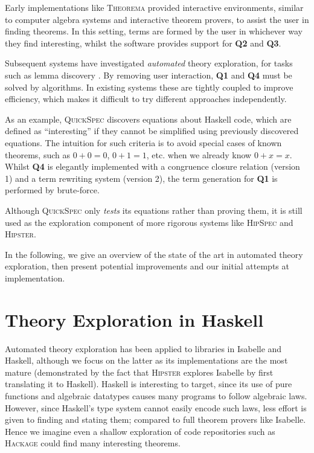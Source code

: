 \documentclass[]{article}
\begin{document}
Early implementations like \textsc{Theorema} \cite{buchberger2000theory}
provided interactive environments, similar to computer algebra systems and
interactive theorem provers, to assist the user in finding theorems. In this
setting, terms are formed by the user in whichever way they find interesting,
whilst the software provides support for \textbf{Q2} and \textbf{Q3}.

Subsequent systems have investigated \emph{automated} theory exploration, for
tasks such as lemma discovery \cite{Hipster}. By removing user interaction,
\textbf{Q1} and \textbf{Q4} must be solved by algorithms. In existing
systems these are tightly coupled to improve efficiency, which makes it
difficult to try different approaches independently.

As an example, \textsc{QuickSpec} \cite{QuickSpec} discovers equations about
Haskell code, which are defined as ``interesting'' if they cannot be simplified
using previously discovered equations. The intuition for such criteria is to
avoid special cases of known theorems, such as $0 + 0 = 0$, $0 + 1 = 1$, etc.
when we already know $0 + x = x$. Whilst \textbf{Q4} is elegantly implemented
with a congruence closure relation (version 1) and a term rewriting system
(version 2), the term generation for \textbf{Q1} is performed by brute-force.

Although \textsc{QuickSpec} only \emph{tests} its equations rather than
proving them, it is still used as the exploration component of more rigorous
systems like \textsc{HipSpec} and \textsc{Hipster}.

In the following, we give an overview of the state of the art in automated
theory exploration, then present potential improvements and our initial attempts
at implementation.

\section{Theory Exploration in Haskell}\label{haskell}

Automated theory exploration has been applied to libraries in Isabelle
and Haskell, although we focus on the latter as its implementations are
the most mature (demonstrated by the fact that \textsc{Hipster} explores
Isabelle by first translating it to Haskell). Haskell is interesting to target,
since its use of pure functions and algebraic datatypes causes many programs to
follow algebraic laws. However, since Haskell's type system cannot easily
encode such laws, less effort is given to finding and stating them; compared to
full theorem provers like Isabelle. Hence we imagine even a shallow exploration
of code repositories such as \textsc{Hackage} could find many interesting
theorems.
\end{document}
